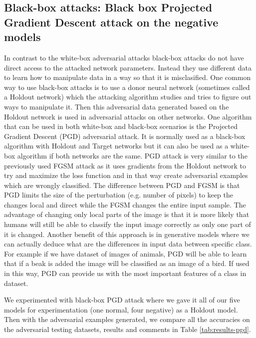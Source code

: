 \documentclass[b5paper]{book}
\let\cite\parencite
\begin{document}
\subsection{Black-box attacks: Black box Projected Gradient Descent attack on the negative models}

In contrast to the white-box adversarial attacks black-box attacks do not have direct access to the attacked network parameters. Instead they use different data to learn how to manipulate data in a way so that it is misclasified. One common way to use black-box attacks is to use a donor neural network (sometimes called a Holdout network) which the attacking algorithm studies and tries to figure out ways to manipulate it. Then this adversarial data generated based on the Holdout network is used in adversarial attacks on other networks. One algorithm that can be used in both white-box and black-box scenarios is the Projected Gradient Descent (PGD) \cite{madry2017towards} adversarial attack. It is normally used as a black-box algorithm with Holdout and Target networks but it can also be used as a white-box algorithm if both networks are the same. PGD attack is very similar to the previously used FGSM attack as it uses gradients from the Holdout network to try and maximize the loss function and in that way create adversarial examples which are wrongly classified. The difference between PGD and FGSM is that PGD limits the size of the perturbation (e.g. number of pixels) to keep the changes local and direct while the FGSM changes the entire input sample. The advantage of changing only local parts of the image is that it is more likely that humans will still be able to classify the input image correctly as only one part of it is changed. Another benefit of this approach is in generative models where we can actually deduce what are the differences in input data between specific class. For example if we have dataset of images of animals, PGD will be able to learn that if a beak is added the image will be classified as an image of a bird. If used in this way, PGD can provide us with the most important features of a class in dataset.

We experimented with black-box PGD attack where we gave it all of our five models for experimentation (one normal, four negative) as a Holdout model. Then with the adversarial examples generated, we compare all the accuracies on the adversarial testing datasets, results and comments in Table \ref{tab:results-pgd}.
\end{document}
